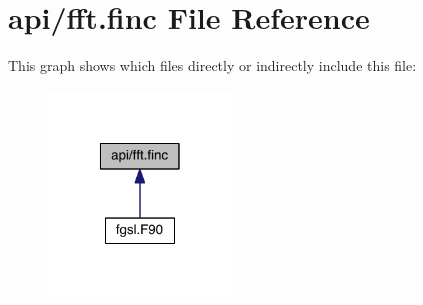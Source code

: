 \hypertarget{fft_8finc}{\section{api/fft.finc File Reference}
\label{fft_8finc}
}
This graph shows which files directly or indirectly include this file\-:\nopagebreak
\begin{figure}[H]
\begin{center}
\leavevmode
\includegraphics[width=138pt]{fft_8finc__dep__incl}
\end{center}
\end{figure}
